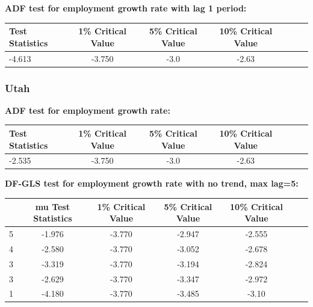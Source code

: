 \documentclass{article}
\begin{document}
\vspace{0.5cm}

\noindent \textbf{ADF test for employment growth rate with lag 1 period: }
\begin{center}
\resizebox{13cm}{!}
{
\begin{tabular}{lcccccc} \hline
    Test Statistics & 1\% Critical Value& 5\% Critical Value & 10\% Critical Value \\ \hline
    -4.613 & -3.750 & -3.0 & -2.63 \\ \hline
\end{tabular}
}
\end{center}

\vspace{0.5cm}

\subsubsection{Utah}
\noindent \textbf{ADF test for employment growth rate: }
\begin{center}
    \resizebox{13cm}{!}
    {
    \begin{tabular}{lcccccc} \hline
        Test Statistics & 1\% Critical Value& 5\% Critical Value & 10\% Critical Value \\ \hline
        -2.535 & -3.750 & -3.0 & -2.63 \\ \hline
    \end{tabular}
    }
\end{center}

\vspace{0.5cm}

\noindent \textbf{DF-GLS test for employment growth rate with no trend, max lag=5:}
\begin{center}
\resizebox{13cm}{!}
{
\begin{tabular}{lcccccc} \hline
    [lags] & mu Test Statistics & 1\% Critical Value& 5\% Critical Value & 10\% Critical Value \\ \hline
    5      & -1.976 & -3.770 & -2.947 & -2.555 \\
    4      & -2.580 & -3.770 & -3.052 & -2.678 \\
    3      & -3.319 & -3.770 & -3.194 & -2.824 \\
    3      & -2.629 & -3.770 & -3.347 & -2.972 \\
    1      & -4.180 & -3.770 & -3.485 & -3.10 \\ \hline
\end{tabular}
}
\end{center}
\end{document}
